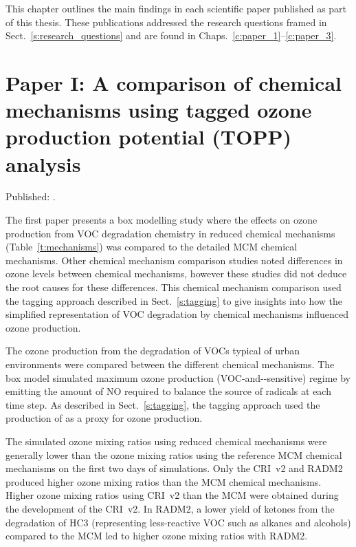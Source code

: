 This chapter outlines the main findings in each scientific paper published as part of this thesis.
These publications addressed the research questions framed in Sect.~\ref{s:research_questions} and are found in Chaps.~\ref{c:paper_1}--\ref{c:paper_3}.

\singlespacing
\section[Paper I]{Paper I: A comparison of chemical mechanisms using tagged ozone production potential (TOPP) analysis} \label{s:chemical_mechanism_results}
\onehalfspacing

Published: .
\vspace{5mm}

The first paper presents a box modelling study where the effects on ozone production from VOC degradation chemistry in reduced chemical mechanisms (Table~\ref{t:mechanisms}) was compared to the detailed MCM chemical mechanisms.
Other chemical mechanism comparison studies noted differences in ozone levels between chemical mechanisms, however these studies did not deduce the root causes for these differences.
This chemical mechanism comparison used the tagging approach described in Sect.~\ref{s:tagging} to give insights into how the simplified representation of VOC degradation by chemical mechanisms influenced ozone production.

The ozone production from the degradation of VOCs typical of urban environments were compared between the different chemical mechanisms.
The box model simulated maximum ozone production (VOC-and--sensitive) regime by emitting the amount of NO required to balance the source of radicals at each time step.
As described in Sect.~\ref{s:tagging}, the tagging approach used the production of  as a proxy for ozone production.

The simulated ozone mixing ratios using reduced chemical mechanisms were generally lower than the ozone mixing ratios using the reference MCM chemical mechanisms on the first two days of simulations.
Only the CRI~v2 and RADM2 produced higher ozone mixing ratios than the MCM chemical mechanisms.
Higher ozone mixing ratios using CRI~v2 than the MCM were obtained during the development of the CRI~v2.
In RADM2, a lower yield of ketones from the degradation of HC3 (representing less-reactive VOC such as alkanes and alcohols) compared to the MCM led to higher ozone mixing ratios with RADM2.

